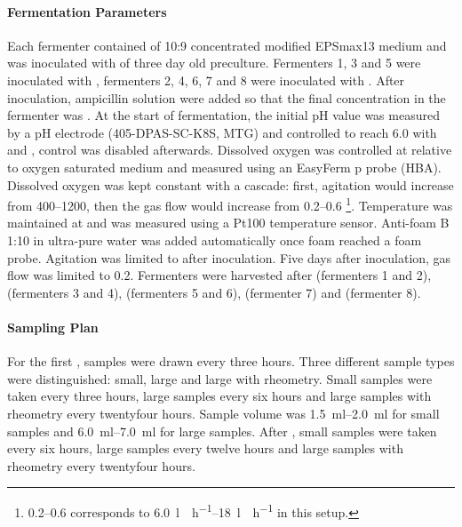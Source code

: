 \paragraph{Fermentation Parameters}
Each fermenter contained  of 10:9 concentrated modified EPSmax13 medium and was inoculated with  of three day old preculture. Fermenters 1, 3 and 5 were inoculated with \rolf{}, fermenters 2, 4, 6, 7 and 8 were inoculated with \comm{}. After inoculation,  ampicillin solution were added so that the final concentration in the fermenter was . At the start of fermentation, the initial pH value was measured by a pH electrode (405-DPAS-SC-K8S, MTG) and controlled to reach \num{6.0} with   and  , control was disabled afterwards. Dissolved oxygen was controlled at  relative to oxygen saturated medium and measured using an EasyFerm p probe (HBA). Dissolved oxygen was kept constant with a cascade: first, agitation would increase from \SIrange{400}{1200}{\rpm}, then the gas flow would increase from \SIrange{0.2}{0.6}{\vvm} \footnote{\SIrange{0.2}{0.6}{\vvm} corresponds to \SIrange{6.0}{18}{\litre\norm\per\hour} in this setup.}. Temperature was maintained at  and was measured using a Pt100 temperature sensor. Anti-foam B 1:10 in ultra-pure water was added automatically once foam reached a foam probe. Agitation was limited to   after inoculation. Five days after inoculation, gas flow was limited to \SI{0.2}{\vvm}. Fermenters were harvested after  (fermenters 1 and 2),  (fermenters 3 and 4),  (fermenters 5 and 6),  (fermenter 7) and  (fermenter 8).

\paragraph{Sampling Plan\label{par-met-mibi-ferm-fungi-sampling}}
For the first , samples were drawn every three hours. Three different sample types were distinguished: small, large and large with rheometry. Small samples were taken every three hours, large samples every six hours and large samples with rheometry every twentyfour hours. Sample volume was \SIrange{1.5}{2.0}{\milli\litre} for small samples and \SIrange{6.0}{7.0}{\milli\litre} for large samples. After , small samples were taken every six hours, large samples every twelve hours and large samples with rheometry every twentyfour hours.

